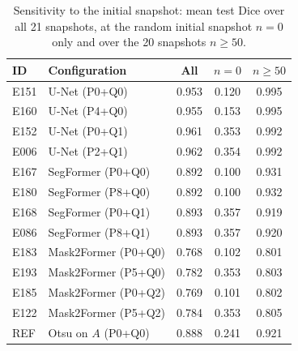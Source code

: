 \begin{table}[t]
\centering
\caption{Sensitivity to the initial snapshot: mean test Dice over all 21 snapshots, at the random initial snapshot $n=0$ only and over the 20 snapshots $n\geq50$.}
\label{tab:sensitivity}
\scriptsize
\setlength{\tabcolsep}{3pt}
\begin{tabularx}{\columnwidth}{L{0.7cm} Y c c c}
\toprule
\textbf{ID} & \textbf{Configuration} & \textbf{All} & \textbf{$n=0$} & \textbf{$n\geq50$} \\
\midrule
E151 & U-Net (P0+Q0) & 0.953 & 0.120 & 0.995 \\
E160 & U-Net (P4+Q0) & 0.955 & 0.153 & 0.995 \\
E152 & U-Net (P0+Q1) & 0.961 & 0.353 & 0.992 \\
E006 & U-Net (P2+Q1) & 0.962 & 0.354 & 0.992 \\
\addlinespace
E167 & SegFormer (P0+Q0) & 0.892 & 0.100 & 0.931 \\
E180 & SegFormer (P8+Q0) & 0.892 & 0.100 & 0.932 \\
E168 & SegFormer (P0+Q1) & 0.893 & 0.357 & 0.919 \\
E086 & SegFormer (P8+Q1) & 0.893 & 0.357 & 0.920 \\
\addlinespace
E183 & Mask2Former (P0+Q0) & 0.768 & 0.102 & 0.801 \\
E193 & Mask2Former (P5+Q0) & 0.782 & 0.353 & 0.803 \\
E185 & Mask2Former (P0+Q2) & 0.769 & 0.101 & 0.802 \\
E122 & Mask2Former (P5+Q2) & 0.784 & 0.353 & 0.805 \\
\addlinespace
REF & Otsu on $A$ (P0+Q0) & 0.888 & 0.241 & 0.921 \\
\bottomrule
\end{tabularx}
\end{table}
